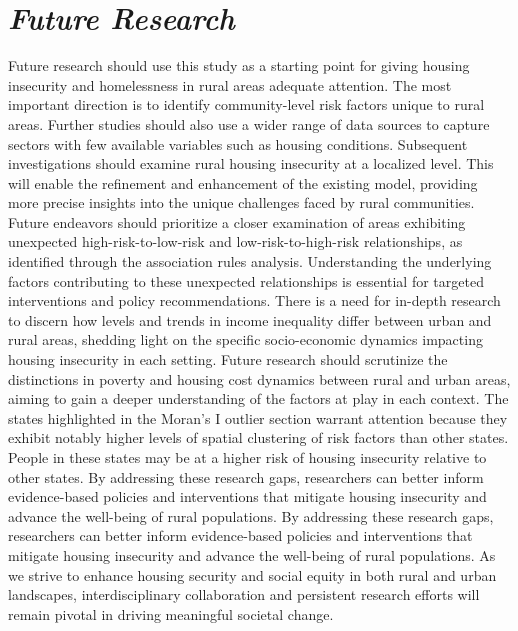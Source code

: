 \section{\textit{Future Research}}

Future research should use this study as a starting point for giving housing insecurity and homelessness in rural areas adequate attention. The most important direction is to identify community-level risk factors unique to rural areas. Further studies should also use a wider range of data sources to capture sectors with few available variables such as housing conditions. Subsequent investigations should examine rural housing insecurity at a localized level. This will enable the refinement and enhancement of the existing model, providing more precise insights into the unique challenges faced by rural communities.	Future endeavors should prioritize a closer examination of areas exhibiting unexpected high-risk-to-low-risk and low-risk-to-high-risk relationships, as identified through the association rules analysis. Understanding the underlying factors contributing to these unexpected relationships is essential for targeted interventions and policy recommendations. There is a need for in-depth research to discern how levels and trends in income inequality differ between urban and rural areas, shedding light on the specific socio-economic dynamics impacting housing insecurity in each setting. Future research should scrutinize the distinctions in poverty and housing cost dynamics between rural and urban areas, aiming to gain a deeper understanding of the factors at play in each context. The states highlighted in the Moran's I outlier section warrant attention because they exhibit notably higher levels of spatial clustering of risk factors than other states. People in these states may be at a higher risk of housing insecurity relative to other states. By addressing these research gaps, researchers can better inform evidence-based policies and interventions that mitigate housing insecurity and advance the well-being of rural populations. By addressing these research gaps, researchers can better inform evidence-based policies and interventions that mitigate housing insecurity and advance the well-being of rural populations. As we strive to enhance housing security and social equity in both rural and urban landscapes, interdisciplinary collaboration and persistent research efforts will remain pivotal in driving meaningful societal change. 

\endinput